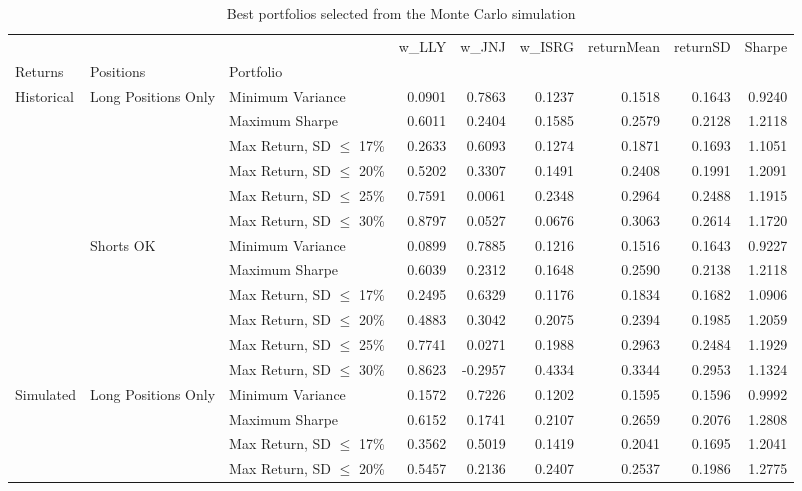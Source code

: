 \begin{table}
\caption{Best portfolios selected from the Monte Carlo simulation}
\label{tab:simulation-selections}
\begin{tabular}{lllrrrrrr}
\toprule
 &  &  & w\_LLY & w\_JNJ & w\_ISRG & returnMean & returnSD & Sharpe \\
Returns & Positions & Portfolio &  &  &  &  &  &  \\
\midrule
\multirow[t]{12}{*}{Historical} & \multirow[t]{6}{*}{Long Positions Only} & Minimum Variance & 0.0901 & 0.7863 & 0.1237 & 0.1518 & 0.1643 & 0.9240 \\
 &  & Maximum Sharpe & 0.6011 & 0.2404 & 0.1585 & 0.2579 & 0.2128 & 1.2118 \\
 &  & Max Return, SD $\leq$ 17\% & 0.2633 & 0.6093 & 0.1274 & 0.1871 & 0.1693 & 1.1051 \\
 &  & Max Return, SD $\leq$ 20\% & 0.5202 & 0.3307 & 0.1491 & 0.2408 & 0.1991 & 1.2091 \\
 &  & Max Return, SD $\leq$ 25\% & 0.7591 & 0.0061 & 0.2348 & 0.2964 & 0.2488 & 1.1915 \\
 &  & Max Return, SD $\leq$ 30\% & 0.8797 & 0.0527 & 0.0676 & 0.3063 & 0.2614 & 1.1720 \\
\cline{2-9}
 & \multirow[t]{6}{*}{Shorts OK} & Minimum Variance & 0.0899 & 0.7885 & 0.1216 & 0.1516 & 0.1643 & 0.9227 \\
 &  & Maximum Sharpe & 0.6039 & 0.2312 & 0.1648 & 0.2590 & 0.2138 & 1.2118 \\
 &  & Max Return, SD $\leq$ 17\% & 0.2495 & 0.6329 & 0.1176 & 0.1834 & 0.1682 & 1.0906 \\
 &  & Max Return, SD $\leq$ 20\% & 0.4883 & 0.3042 & 0.2075 & 0.2394 & 0.1985 & 1.2059 \\
 &  & Max Return, SD $\leq$ 25\% & 0.7741 & 0.0271 & 0.1988 & 0.2963 & 0.2484 & 1.1929 \\
 &  & Max Return, SD $\leq$ 30\% & 0.8623 & -0.2957 & 0.4334 & 0.3344 & 0.2953 & 1.1324 \\
\cline{1-9} \cline{2-9}
\multirow[t]{12}{*}{Simulated} & \multirow[t]{6}{*}{Long Positions Only} & Minimum Variance & 0.1572 & 0.7226 & 0.1202 & 0.1595 & 0.1596 & 0.9992 \\
 &  & Maximum Sharpe & 0.6152 & 0.1741 & 0.2107 & 0.2659 & 0.2076 & 1.2808 \\
 &  & Max Return, SD $\leq$ 17\% & 0.3562 & 0.5019 & 0.1419 & 0.2041 & 0.1695 & 1.2041 \\
 &  & Max Return, SD $\leq$ 20\% & 0.5457 & 0.2136 & 0.2407 & 0.2537 & 0.1986 & 1.2775 \\

\end{tabular}
\end{table}
